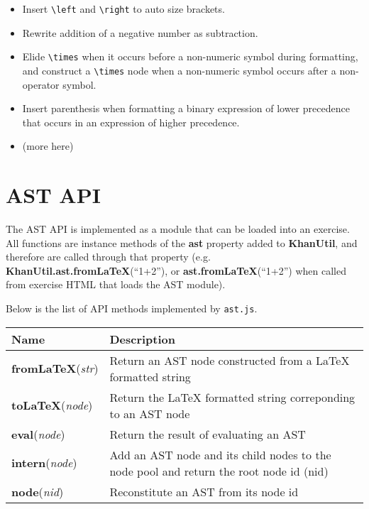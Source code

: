 \documentclass{article}
\begin{document}
\begin{itemize}
\item Insert \verb'\left' and \verb'\right' to auto size brackets.
\item Rewrite addition of a negative number as subtraction.
\item Elide \verb'\times' when it occurs before a non-numeric symbol during formatting, and construct 
      a \verb'\times' node when a non-numeric symbol occurs after a non-operator symbol.
\item Insert parenthesis when formatting a binary expression of lower precedence that occurs in an 
      expression of higher precedence.
\item (more here)
\end{itemize}

\pagebreak
\section{AST API}


The AST API is implemented as a module that can be loaded into an exercise. All functions are 
instance methods of the {\bf ast} property added to {\bf KhanUtil}, and therefore are called through 
that property (e.g. {\bf KhanUtil.ast.fromLaTeX}(``1+2''), or {\bf ast.fromLaTeX}(``1+2'') when 
called from exercise HTML that loads the AST module).

Below is the list of API methods implemented by {\tt ast.js}.

\begin{tabular}{ | l | p{10cm} |}
\hline
{\bf Name} & {\bf Description} \\ \hline
{\bf fromLaTeX}(\emph{str}) & Return an AST node constructed from a LaTeX formatted string \\ \hline
{\bf toLaTeX}(\emph{node})  & Return the LaTeX formatted string correponding to an AST node \\ \hline
{\bf eval}(\emph{node})     & Return the result of evaluating an AST \\ \hline
{\bf intern}(\emph{node})   & Add an AST node and its child nodes to the node pool and return the root node id (nid) \\ \hline
{\bf node}(\emph{nid})      & Reconstitute an AST from its node id \\ \hline
\end{tabular}
\end{document}
